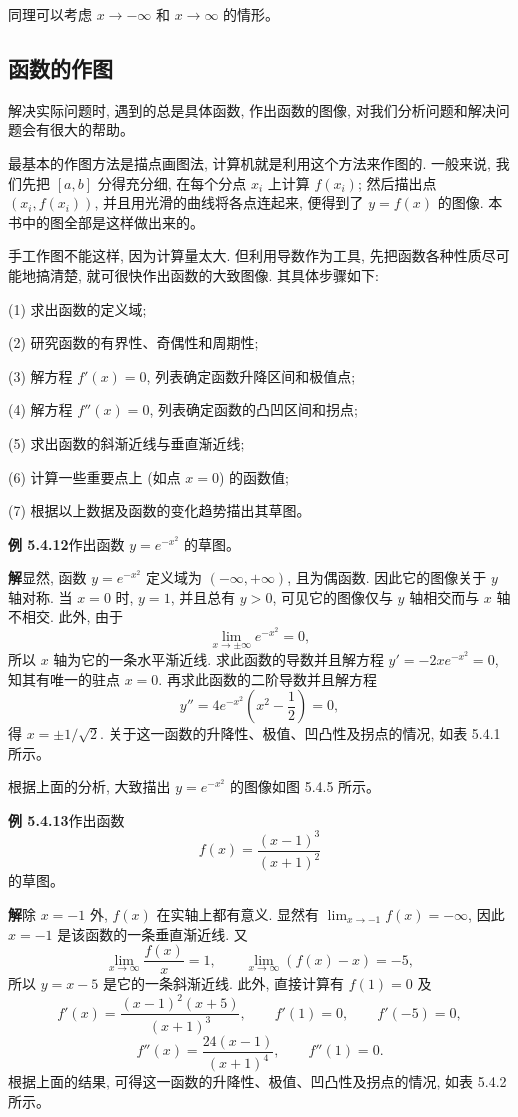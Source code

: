 \documentclass[UTF8, 12pt, fontset=fandol, oneside]{ctexart}
\begin{document}
同理可以考虑 $x\to-\infty$ 和 $x\to\infty$ 的情形。

\subsection{函数的作图}

解决实际问题时, 遇到的总是具体函数, 作出函数的图像, 对我们分析问题和解决问题会有很大的帮助。

最基本的作图方法是描点画图法, 计算机就是利用这个方法来作图的. 一般来说, 我们先把 $[a,b]$ 分得充分细, 在每个分点 $x_i$ 上计算 $f(x_i)$; 然后描出点 $(x_i,f(x_i))$, 并且用光滑的曲线将各点连起来, 便得到了 $y=f(x)$ 的图像. 本书中的图全部是这样做出来的。

手工作图不能这样, 因为计算量太大. 但利用导数作为工具, 先把函数各种性质尽可能地搞清楚, 就可很快作出函数的大致图像. 其具体步骤如下:

(1) 求出函数的定义域;

(2) 研究函数的有界性、奇偶性和周期性;

(3) 解方程 $f'(x)=0$, 列表确定函数升降区间和极值点;

(4) 解方程 $f''(x)=0$, 列表确定函数的凸凹区间和拐点;

(5) 求出函数的斜渐近线与垂直渐近线;

(6) 计算一些重要点上 (如点 $x=0$) 的函数值;

(7) 根据以上数据及函数的变化趋势描出其草图。

\noindent\textbf{例 5.4.12}\quad 作出函数 $y=e^{-x^2}$ 的草图。

\noindent\textbf{解}\quad 显然, 函数 $y=e^{-x^2}$ 定义域为 $(-\infty,+\infty)$, 且为偶函数. 因此它的图像关于 $y$ 轴对称. 当 $x=0$ 时, $y=1$, 并且总有 $y>0$, 可见它的图像仅与 $y$ 轴相交而与 $x$ 轴不相交. 此外, 由于
\[
  \lim_{x\to\pm\infty}e^{-x^2}=0,
\]
所以 $x$ 轴为它的一条水平渐近线. 求此函数的导数并且解方程 $y'=-2xe^{-x^2}=0$, 知其有唯一的驻点 $x=0$. 再求此函数的二阶导数并且解方程
\[
  y''=4e^{-x^2}\left(x^2-\frac12\right)=0,
\]
得 $x=\pm1/\sqrt2$. 关于这一函数的升降性、极值、凹凸性及拐点的情况, 如表 5.4.1 所示。

根据上面的分析, 大致描出 $y=e^{-x^2}$ 的图像如图 5.4.5 所示。

\noindent\textbf{例 5.4.13}\quad 作出函数
\[
  f(x)=\frac{(x-1)^3}{(x+1)^2}
\]
的草图。

\noindent\textbf{解}\quad 除 $x=-1$ 外, $f(x)$ 在实轴上都有意义. 显然有 $\lim_{x\to-1}f(x)=-\infty$, 因此 $x=-1$ 是该函数的一条垂直渐近线. 又
\[
  \lim_{x\to\infty}\frac{f(x)}x=1,\qquad
  \lim_{x\to\infty}(f(x)-x)=-5,
\]
所以 $y=x-5$ 是它的一条斜渐近线. 此外, 直接计算有 $f(1)=0$ 及
\[
  f'(x)=\frac{(x-1)^2(x+5)}{(x+1)^3},\qquad
  f'(1)=0,\qquad f'(-5)=0,
\]
\[
  f''(x)=\frac{24(x-1)}{(x+1)^4},\qquad f''(1)=0.
\]
根据上面的结果, 可得这一函数的升降性、极值、凹凸性及拐点的情况, 如表 5.4.2 所示。
\end{document}
